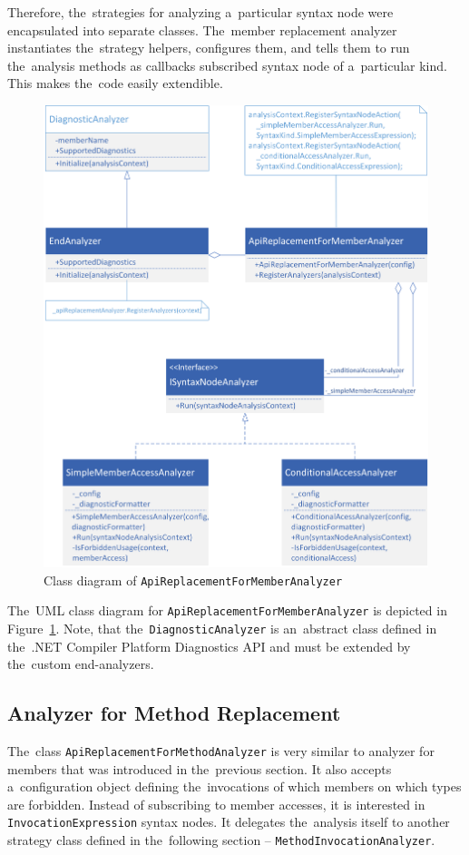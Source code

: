 \documentclass[
  digital, %
  table,   %
  lof,     %
  lot,     %
  oneside,
]{fithesis3}
\begin{document}
Therefore, the~strategies for analyzing a~particular syntax node were encapsulated into separate classes. The~member replacement analyzer instantiates the~strategy helpers, configures them, and tells them to run the~analysis methods as callbacks subscribed syntax node of a~particular kind. This makes the~code easily extendible.

\begin{figure}[h!]
		\centering
			\includegraphics[scale=0.8]{img/uml/api-replacement-for-member}
		\caption{Class diagram of \texttt{ApiReplacementForMemberAnalyzer}}
		\label{fig:uml-api-replacement-for-member}
\end{figure}

The~UML class diagram for \texttt{ApiReplacementForMemberAnalyzer} is depicted in Figure~\ref{fig:uml-api-replacement-for-member}. Note, that the~\texttt{DiagnosticAnalyzer} is an~abstract class defined in the~.NET Compiler Platform Diagnostics API and must be extended by the~custom end-analyzers.

\subsection{Analyzer for Method Replacement}
The~class \texttt{ApiReplacementForMethodAnalyzer} is very similar to analyzer for members that was introduced in the~previous section. It also accepts a~configuration object defining the~invocations of which members on which types are forbidden. 
Instead of subscribing to member accesses, it is interested in \texttt{InvocationExpression} syntax nodes. It delegates the~analysis itself to another strategy class defined in the~following section -- \texttt{MethodInvocationAnalyzer}.
\end{document}
